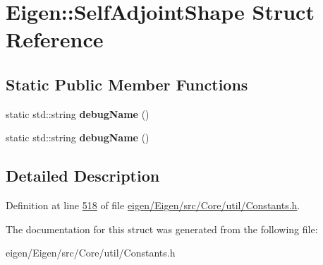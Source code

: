 \hypertarget{struct_eigen_1_1_self_adjoint_shape}{}\section{Eigen\+:\+:Self\+Adjoint\+Shape Struct Reference}
\label{struct_eigen_1_1_self_adjoint_shape}
\subsection*{Static Public Member Functions}
\begin{DoxyCompactItemize}
\item 
\mbox{\label{struct_eigen_1_1_self_adjoint_shape_a52c0289f8b1a896123ac4da6a889963e}} 
static std\+::string {\bfseries debug\+Name} ()
\item 
\mbox{\label{struct_eigen_1_1_self_adjoint_shape_a52c0289f8b1a896123ac4da6a889963e}} 
static std\+::string {\bfseries debug\+Name} ()
\end{DoxyCompactItemize}


\subsection{Detailed Description}


Definition at line \hyperlink{eigen_2_eigen_2src_2_core_2util_2_constants_8h_source_l00518}{518} of file \hyperlink{eigen_2_eigen_2src_2_core_2util_2_constants_8h_source}{eigen/\+Eigen/src/\+Core/util/\+Constants.\+h}.



The documentation for this struct was generated from the following file\+:\begin{DoxyCompactItemize}
\item 
eigen/\+Eigen/src/\+Core/util/\+Constants.\+h\end{DoxyCompactItemize}

